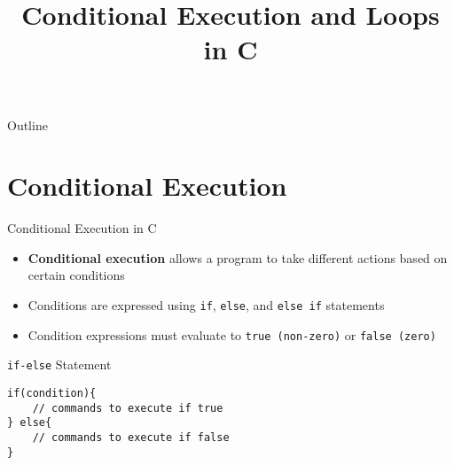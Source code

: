 \documentclass[12pt, aspectratio=169]{beamer}
\title{Conditional Execution and Loops in C}
\author{}
\date{}
\begin{document}
    {
		\addtocounter{framenumber}{-2}    %

		\begin{frame}
			\titlepage
		\end{frame}

		\begin{frame}{Outline}
            \small
			\tableofcontents[subsectionstyle=hide]
		\end{frame}
	}

    \section{Conditional Execution}

    \begin{frame}{Conditional Execution in C}
        \begin{itemize}
            \item \textbf{Conditional execution} allows a program to take different actions based on certain conditions
            \item Conditions are expressed using \texttt{if}, \texttt{else}, and \texttt{else if} statements
            \item Condition expressions must evaluate to \texttt{true (non-zero)} or \texttt{false (zero)}
        \end{itemize}
    \end{frame}




    \begin{frame}[fragile]{\texttt{if-else} Statement}
        \begin{verbatim}
if(condition){
    // commands to execute if true
} else{
    // commands to execute if false
}
        \end{verbatim}

    \end{frame}
\end{document}
